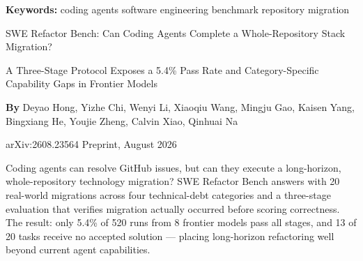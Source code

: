 \documentclass[10pt,twocolumn]{article}
\begin{document}
\setlength{\parindent}{0pt}
\setlength{\parskip}{4pt}

{\small\color{keywordgray}\textbf{Keywords:}
  coding agents \textbullet{}
  software engineering \textbullet{}
  benchmark \textbullet{}
  repository migration}\par\vspace{4pt}

{\LARGE\bfseries\raggedright
  SWE Refactor Bench: Can Coding Agents Complete
  a Whole-Repository Stack Migration?}\par\vspace{4pt}

{\large\itshape\raggedright
  A Three-Stage Protocol Exposes a 5.4\% Pass Rate
  and Category-Specific Capability Gaps in Frontier Models}\par\vspace{6pt}

{\small\textbf{By} Deyao Hong, Yizhe Chi, Wenyi Li, Xiaoqiu Wang,
  Mingju Gao, Kaisen Yang, Bingxiang He, Youjie Zheng,
  Calvin Xiao, Qinhuai Na}\par\vspace{2pt}

{\small\color{keywordgray}arXiv:2608.23564 \textbullet{} Preprint, August 2026}
\par\vspace{2pt}\noindent{\color{rulered}\rule{\columnwidth}{0.6pt}}\vspace{6pt}

Coding agents can resolve GitHub issues, but can they execute
a long-horizon, whole-repository technology migration? SWE Refactor
Bench answers with 20 real-world migrations across four technical-debt
categories and a three-stage evaluation that verifies migration actually
occurred before scoring correctness. The result: only 5.4\% of 520 runs
from 8 frontier models pass all stages, and 13 of 20 tasks receive no
accepted solution — placing long-horizon refactoring well beyond current
agent capabilities.
\end{document}
